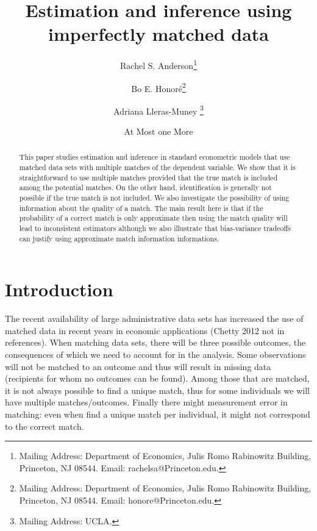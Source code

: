 \documentclass[12pt]{article}
\begin{document}
\author{Rachel S. Anderson\thanks{%
Mailing Address: Department of Economics, Julis Romo Rabinowitz Building,
Princeton, NJ 08544. Email: rachelsa@Princeton.edu.} \and Bo E. Honor\'{e}\thanks{%
Mailing Address: Department of Economics, Julis Romo Rabinowitz Building,
Princeton, NJ 08544. Email: honore@Princeton.edu.} \and Adriana Lleras-Muney%
\thanks{%
Mailing Address: UCLA.} \and At Most one More}
\title{Estimation and inference using imperfectly matched data}
\maketitle

\begin{abstract}
\singlespacing
This paper studies estimation and inference in standard econometric models
that use matched data sets with multiple matches of the dependent variable.
We show that it is straightforward to use multiple matches provided that the
true match is included among the potential matches. On the other hand,
identification is generally not possible if the true match is not included.
We also investigate the possibility of using information about the quality
of a match. The main result here is that if the probability of a correct
match is only approximate then using the match quality will lead to
inconsistent estimators although we also illustrate that bias-variance
tradeoffs can justify using approximate match information informations.
\end{abstract}


\section{Introduction}

The recent availability of large administrative data sets has increased the
use of matched data in recent years in economic applications (Chetty 2012
not in references). When matching data sets, there will be three possible
outcomes, the consequences of which we need to account for in the analysis.
Some observations will not be matched to an outcome and thus will result in
missing data (recipients for whom no outcomes can be found). Among those
that are matched, it is not always possible to find a unique match, thus for
some individuals we will have multiple matches/outcomes. Finally there might
measurement error in matching: even when find a unique match per individual,
it might not correspond to the correct match.
\end{document}
